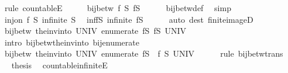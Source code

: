 \begin{isabellebody}
\ {\isacharparenleft}rule\ countableE{\isacharparenright}\isanewline
\ \ \isamarkupfalse%
\ \isamarkupfalse%
\ {\isachardoublequoteopen}bij{\isacharunderscore}betw\ f\ S\ {\isacharparenleft}f{\isacharbackquote}S{\isacharparenright}{\isachardoublequoteclose}\isanewline
\ \ \ \ \isamarkupfalse%
\ bij{\isacharunderscore}betw{\isacharunderscore}def\ \isamarkupfalse%
\ simp\isanewline
\ \ \isamarkupfalse%
\isanewline
\ \ \isamarkupfalse%
\ {\isacartoucheopen}inj{\isacharunderscore}on\ f\ S{\isacartoucheclose}\ {\isacartoucheopen}infinite\ S{\isacartoucheclose}\ \isamarkupfalse%
\ inf{\isacharunderscore}fS{\isacharcolon}\ {\isachardoublequoteopen}infinite\ {\isacharparenleft}f{\isacharbackquote}S{\isacharparenright}{\isachardoublequoteclose}\isanewline
\ \ \ \ \isamarkupfalse%
\ {\isacharparenleft}auto\ dest{\isacharcolon}\ finite{\isacharunderscore}imageD{\isacharparenright}\isanewline
\ \ \isamarkupfalse%
\ \isamarkupfalse%
\ {\isachardoublequoteopen}bij{\isacharunderscore}betw\ {\isacharparenleft}the{\isacharunderscore}inv{\isacharunderscore}into\ UNIV\ {\isacharparenleft}enumerate\ {\isacharparenleft}f{\isacharbackquote}S{\isacharparenright}{\isacharparenright}{\isacharparenright}\ {\isacharparenleft}f{\isacharbackquote}S{\isacharparenright}\ UNIV{\isachardoublequoteclose}\isanewline
\ \ \ \ \isamarkupfalse%
\ {\isacharparenleft}intro\ bij{\isacharunderscore}betw{\isacharunderscore}the{\isacharunderscore}inv{\isacharunderscore}into\ bij{\isacharunderscore}enumerate{\isacharparenright}\isanewline
\ \ \isamarkupfalse%
\ \isamarkupfalse%
\ {\isachardoublequoteopen}bij{\isacharunderscore}betw\ {\isacharparenleft}the{\isacharunderscore}inv{\isacharunderscore}into\ UNIV\ {\isacharparenleft}enumerate\ {\isacharparenleft}f{\isacharbackquote}S{\isacharparenright}{\isacharparenright}\ {\isasymcirc}\ f{\isacharparenright}\ S\ UNIV{\isachardoublequoteclose}\isanewline
\ \ \ \ \isamarkupfalse%
\ {\isacharparenleft}rule\ bij{\isacharunderscore}betw{\isacharunderscore}trans{\isacharparenright}\isanewline
\ \ \isamarkupfalse%
\ \isamarkupfalse%
\ thesis\ \isacommand{{\isachardot}{\isachardot}}\isamarkupfalse%
\isanewline
{}\isamarkupfalse%
%
\endisatagproof
{\isafoldproof}%
%
\isadelimproof
\isanewline
%
\endisadelimproof
\isanewline
{}\isamarkupfalse%
\ countable{\isacharunderscore}infiniteE{\isacharprime}{\isacharcolon}\isanewline

\end{isabellebody}
